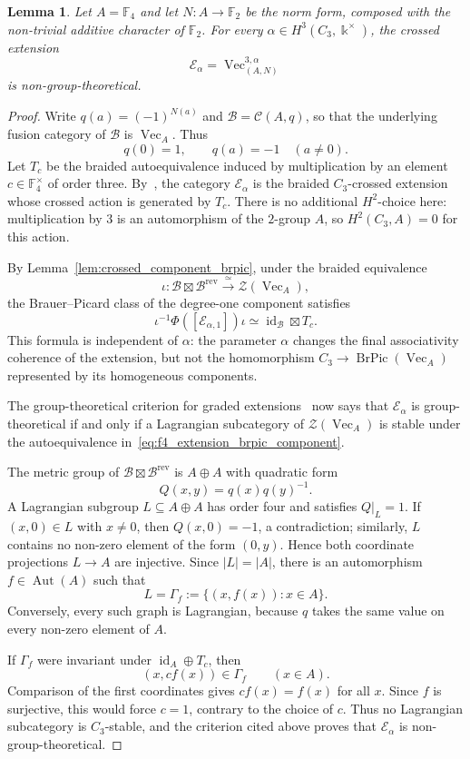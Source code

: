 \documentclass[12pt]{amsart}
\theoremstyle{plain}
\newtheorem{lemma}[theorem]{Lemma}
\theoremstyle{definition} %
\theoremstyle{remark} %
\newcommand{\ku}{{\Bbbk}} %
\DeclareMathOperator{\VecCat}{Vec}
\newcommand{\Vect}[1]{\VecCat_{#1}}
\newcommand{\cC}{\mathcal{C}}
\newcommand{\cB}{\mathcal{B}}
\newcommand{\cE}{\mathcal{E}}
\newcommand{\Aut}{\operatorname{Aut}}
\newcommand{\id}{\operatorname{id}}
\begin{document}
\begin{lemma}\label{lem:f4_elliptic_extension_non_gt}
Let $A=\mathbb{F}_4$ and let $N:A\to\mathbb{F}_2$ be the norm form, composed with the non-trivial additive character of $\mathbb{F}_2$. For every $\alpha\in H^3(C_3,\ku^\times)$, the crossed extension
\[
\cE_\alpha=\VecCat_{(A,N)}^{3,\alpha}
\]
is non-group-theoretical.
\end{lemma}

\begin{proof}
Write $q(a)=(-1)^{N(a)}$ and $\cB=\cC(A,q)$, so that the underlying fusion category of $\cB$ is $\Vect{A}$. Thus
\[
q(0)=1,
\qquad
q(a)=-1\quad(a\ne0).
\]
Let $T_c$ be the braided autoequivalence induced by multiplication by an element $c\in\mathbb{F}_4^\times$ of order three. By~\cite[Definition~2.1 and Example~3.3(1)]{GPR24}, the category $\cE_\alpha$ is the braided $C_3$-crossed extension whose crossed action is generated by $T_c$.  There is no additional $H^2$-choice here: multiplication by $3$ is an automorphism of the $2$-group $A$, so $H^2(C_3,A)=0$ for this action.

By Lemma~\ref{lem:crossed_component_brpic}, under the braided equivalence
\[
\iota:\cB\boxtimes\cB^{\mathrm{rev}}
\xrightarrow{\ \simeq\ }
\mathcal Z(\Vect{A}),
\]
the Brauer--Picard class of the degree-one component satisfies
\begin{equation}\label{eq:f4_extension_brpic_component}
\iota^{-1}\Phi([\cE_{\alpha,1}])\iota
\simeq
\id_{\cB}\boxtimes T_c.
\end{equation}
This formula is independent of $\alpha$: the parameter $\alpha$ changes the final associativity coherence of the extension, but not the homomorphism
$C_3\to\operatorname{BrPic}(\Vect{A})$ represented by its homogeneous components.

The group-theoretical criterion for graded extensions~\cite[Theorem~16 and Remark~17]{MeMu12} now says that $\cE_\alpha$ is group-theoretical if and only if a Lagrangian subcategory of $\mathcal Z(\Vect{A})$ is stable under the autoequivalence in~\eqref{eq:f4_extension_brpic_component}.

The metric group of $\cB\boxtimes\cB^{\mathrm{rev}}$ is $A\oplus A$ with quadratic form
\[
Q(x,y)=q(x)q(y)^{-1}.
\]
A Lagrangian subgroup $L\subseteq A\oplus A$ has order four and satisfies $Q|_L=1$. If $(x,0)\in L$ with $x\ne0$, then $Q(x,0)=-1$, a contradiction; similarly, $L$ contains no non-zero element of the form $(0,y)$. Hence both coordinate projections $L\to A$ are injective. Since $|L|=|A|$, there is an automorphism $f\in\Aut(A)$ such that
\[
L=\Gamma_f:=\{(x,f(x)):x\in A\}.
\]
Conversely, every such graph is Lagrangian, because $q$ takes the same value on every non-zero element of $A$.

If $\Gamma_f$ were invariant under $\id_A\oplus T_c$, then
\[
(x,cf(x))\in\Gamma_f
\qquad(x\in A).
\]
Comparison of the first coordinates gives $cf(x)=f(x)$ for all $x$. Since $f$ is surjective, this would force $c=1$, contrary to the choice of $c$. Thus no Lagrangian subcategory is $C_3$-stable, and the criterion cited above proves that $\cE_\alpha$ is non-group-theoretical.
\end{proof}
\end{document}
